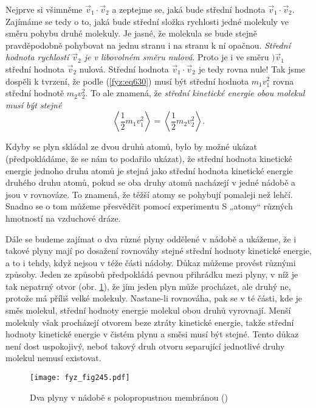     Nejprve si všimněme \(\vec{v}_1\cdot\vec{v}_2\) a zeptejme se, jaká bude střední hodnota
    \(\vec{v}_1\cdot\vec{v}_2\). Zajímáme se tedy o to, jaká bude střední složka rychlosti jedné
    molekuly ve směru pohybu druhé molekuly. Je jasné, že molekula se bude stejně pravděpodobně
    pohybovat na jednu stranu i na stranu k ní opačnou. \emph{Střední hodnota rychlostí
    \(\vec{v}_2\) je v libovolném směru nulová}. Proto je i ve směru \()\vec{v}_1\) střední hodnota
    \(\vec{v}_2\) nulová. Střední hodnota \(\vec{v}_1\cdot\vec{v}_2\) je tedy rovna nule! Tak jsme
    dospěli k tvrzení, že podle (\ref{fyz:eq630}) musí být střední hodnota \(m_1v^2_1\) rovna
    střední hodnotě \(m_2v^2_2\). To ale znamená, že \emph{střední kinetické energie obou molekul
    musí být stejné}
    \begin{equation}\label{fyz:eq631}
      \left\langle\frac{1}{2}m_1v^2_1\right\rangle = \left\langle\frac{1}{2}m_2v^2_2\right\rangle.
    \end{equation}

    Kdyby se plyn skládal ze dvou druhů atomů, bylo by možné ukázat (předpokládáme, že se nám
    to podařilo ukázat), že střední hodnota kinetické energie jednoho druhu atomů je stejná jako
    střední hodnota kinetické energie druhého druhu atomů, pokud se oba druhy atomů nacházejí v
    jedné nádobě a jsou v rovnováze. To znamená, že těžší atomy se pohybují pomaleji než lehčí.
    Snadno se o tom můžeme přesvědčit pomocí experimentu S „atomy“ různých hmotností na vzduchové
    dráze.

    Dále se budeme zajímat o dva různé plyny oddělené v nádobě a ukážeme, že i takové plyny mají po
    dosažení rovnováhy stejné střední hodnoty kinetické energie, a to i tehdy, když nejsou v téže
    části nádoby. Důkaz můžeme provést různými způsoby. Jeden ze způsobů předpokládá pevnou
    přihrádku mezi plyny, v níž je tak nepatrný otvor (obr. \ref{fyz:fig245}), že jím jeden plyn
    může procházet, ale druhý ne, protože má příliš velké molekuly. Nastane-li rovnováha, pak se v
    té části, kde je směs molekul, střední hodnoty energie molekul obou druhů vyrovnají. Menší
    molekuly však procházejí otvorem beze ztráty kinetické energie, takže střední hodnoty kinetické
    energie v čistém plynu a směsi musí být stejné. Tento důkaz není dost uspokojivý, neboť takový
    druh otvoru separující jednotlivé druhy molekul nemusí existovat.

    \begin{figure}[ht!] %
      \centering
      \texttt{[image: fyz\_fig245.pdf]}
      \caption{Dva plyny v nádobě s polopropustnou membránou (\cite[s.~533]{Feynman01})}
      \label{fyz:fig245}
    \end{figure}

